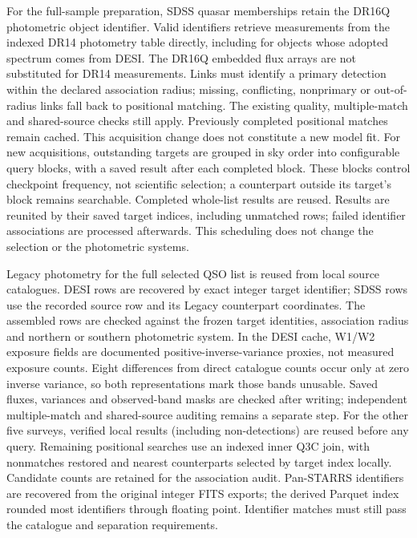\documentclass[11pt,a4paper]{article}
\begin{document}
For the full-sample preparation, SDSS quasar memberships retain the DR16Q
photometric object identifier. Valid identifiers retrieve measurements from
the indexed DR14 photometry table directly, including for objects whose adopted
spectrum comes from DESI. The DR16Q embedded flux arrays are not substituted
for DR14 measurements. Links must identify a primary detection within the
declared association radius; missing, conflicting, nonprimary or out-of-radius
links fall back to positional matching. The existing quality, multiple-match
and shared-source checks still apply. Previously completed positional matches
remain cached. This acquisition change does not constitute a new model fit.
For new acquisitions, outstanding targets are grouped in sky order into
configurable query blocks, with a saved result after each completed block.
These blocks control checkpoint frequency, not scientific selection; a
counterpart outside its target's block remains searchable. Completed
whole-list results are reused. Results are reunited by their
saved target indices, including unmatched rows; failed identifier associations
are processed afterwards. This scheduling does not change the selection or
the photometric systems.

Legacy photometry for the full selected QSO list is reused from local source
catalogues. DESI rows are recovered by exact integer target identifier;
SDSS rows use the recorded source row and its Legacy counterpart coordinates.
The assembled rows are checked against the frozen target identities, association
radius and northern or southern photometric system. In the DESI cache, W1/W2
exposure fields are documented positive-inverse-variance proxies, not measured
exposure counts. Eight differences from direct catalogue counts occur only at
zero inverse variance, so both representations mark those bands unusable.
Saved fluxes, variances and observed-band masks are checked after writing;
independent multiple-match and shared-source auditing remains a separate step.
For the other five surveys, verified local results (including non-detections)
are reused before any query. Remaining positional searches use an indexed
inner Q3C join, with nonmatches restored and nearest counterparts selected by
target index locally. Candidate counts are retained for the association audit.
Pan-STARRS identifiers are recovered from the original integer FITS exports;
the derived Parquet index rounded most identifiers through floating point.
Identifier matches must still pass the catalogue and separation requirements.
\end{document}
